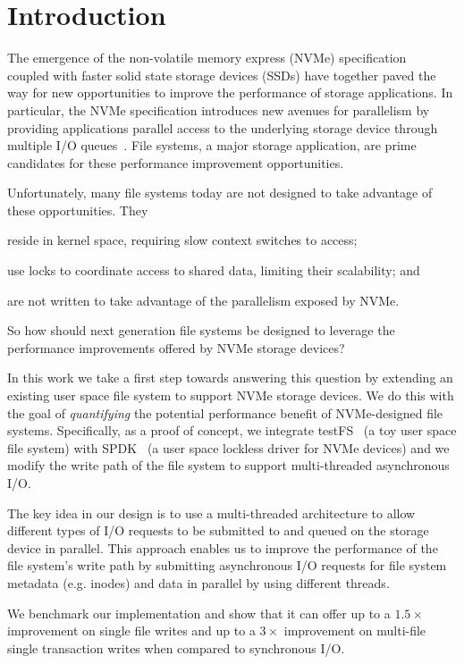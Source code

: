 \section{Introduction}
The emergence of the non-volatile memory express (NVMe)
specification~\cite{nvme} coupled with faster solid state storage devices
(SSDs) have together paved the way for new opportunities to improve the
performance of storage applications. In particular, the NVMe specification
introduces new avenues for parallelism by providing applications parallel
access to the underlying storage device through multiple I/O
queues~\cite{nvme}. File systems, a major storage application, are prime
candidates for these performance improvement opportunities.

Unfortunately, many file systems today are not designed to take advantage of
these opportunities. They
\begin{enumerate*}[label={(\roman*)}]
  \item reside in kernel space, requiring slow context switches to access;
  \item use locks to coordinate access to shared data, limiting their
    scalability; and
  \item are not written to take advantage of the parallelism exposed by NVMe.
\end{enumerate*}
So how should next generation file systems be designed to leverage the
performance improvements offered by NVMe storage devices?

In this work we take a first step towards answering this question by extending
an existing user space file system to support NVMe storage devices. We do this
with the goal of {\it quantifying} the potential performance benefit of
NVMe-designed file systems. Specifically, as a proof of concept, we integrate
testFS~\cite{testfs} (a toy user space file system) with SPDK~\cite{spdk} (a
user space lockless driver for NVMe devices) and we modify the write path of
the file system to support multi-threaded asynchronous I/O.

The key idea in our design is to use a multi-threaded architecture to allow
different types of I/O requests to be submitted to and queued on the storage
device in parallel. This approach enables us to improve the performance of the
file system's write path by submitting asynchronous I/O requests for file
system metadata (e.g. inodes) and data in parallel by using different threads.

We benchmark our implementation and show that it can offer up to a $1.5\times$
improvement on single file writes and up to a $3\times$ improvement on
multi-file single transaction writes when compared to synchronous I/O.

